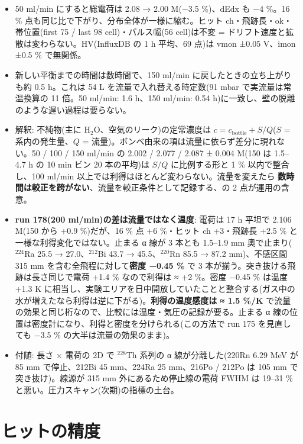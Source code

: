\documentclass[a4paper,11pt]{ltjsarticle}
\begin{document}
\begin{itemize}
\item 50 ml/min にすると総電荷は 2.08 → 2.00 M(−3.5 \%)、dEdx も −4 \%。16 \% 点も同じ比で下がり、分布全体が一様に縮む。ヒット ch・飛跡長・ok・帯位置(first 75 / last 98 cell)・パルス幅(56 cell)は不変 = ドリフト速度と拡散は変わらない。HV(InfluxDB の 1 h 平均、69 点)は vmon ±0.05 V、imon ±0.5 \% で無関係。
\item 新しい平衡までの時間は数時間で、150 ml/min に戻したときの立ち上がりも約 0.5 h。これは 54 L を流量で入れ替える時定数(91 mbar で実流量は常温換算の 11 倍。50 ml/min: 1.6 h、150 ml/min: 0.54 h)に一致し、壁の脱離のような遅い過程は要らない。
\item 解釈: 不純物(主に H$_2$O、空気のリーク)の定常濃度は $c = c_\mathrm{bottle} + S/Q$($S$ = 系内の発生量、$Q$ = 流量)。ボンベ由来の項は流量に依らず差分に現れない。50 / 100 / 150 ml/min の 2.002 / 2.077 / 2.087 ± 0.004 M(150 は 1.5--4.7 h の 10 min ビン 20 本の平均)は $S/Q$ に比例する形と 1 \% 以内で整合し、100 ml/min 以上では利得はほとんど変わらない。流量を変えたら \textbf{数時間は較正を跨がない}、流量を較正条件として記録する、の 2 点が運用の含意。
\item \textbf{run 178(200 ml/min)の差は流量ではなく温度}: 電荷は 17 h 平坦で 2.106 M(150 から +0.9 \%)だが、16 \% 点 +6 \%・ヒット ch +3・飛跡長 +2.5 \% と一様な利得変化ではない。止まる α 線が 3 本とも 1.5--1.9 mm 奥で止まり($^{224}$Ra 25.5 → 27.0、$^{212}$Bi 43.7 → 45.5、$^{220}$Rn 85.5 → 87.2 mm)、不感区間 315 mm を含む全飛程に対して\textbf{密度 −0.45 \%} で 3 本が揃う。突き抜ける飛跡は長さ同じで電荷 +1.4 \% なので利得は ≈ +2 \%。密度 −0.45 \% は温度 +1.3 K に相当し、実験エリアを日中開放していたことと整合する(ガス中の水が増えたなら利得は逆に下がる)。\textbf{利得の温度感度は ≈ 1.5 \%/K} で流量の効果と同じ桁なので、比較には温度・気圧の記録が要る。止まる α 線の位置は密度計になり、利得と密度を分けられる(この方法で run 175 を見直しても −3.5 \% の大半は流量の効果のまま)。
\item 付随: 長さ × 電荷の 2D で $^{228}$Th 系列の α 線が分離した(220Rn 6.29 MeV が 85 mm で停止、212Bi 45 mm、224Ra 25 mm、216Po / 212Po は 105 mm で突き抜け)。線源が 315 mm 外にあるため停止線の電荷 FWHM は 19--31 \% と悪い。圧力スキャン(次期)の指標の土台。
\end{itemize}

\section{ヒットの精度}
\end{document}
